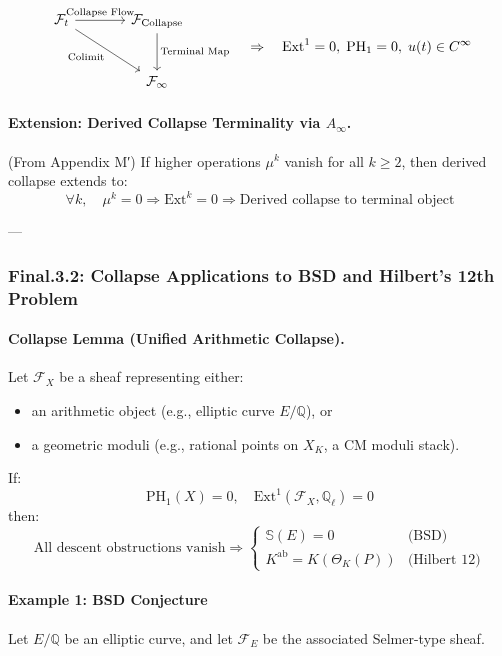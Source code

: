 \documentclass[11pt]{article}
\newcommand{\Sha}{\mathbb{S}}
\begin{document}
\begin{axiom}
\begin{axiom}
{{\[
\begin{tikzcd}[row sep=large, column sep=large]
\mathcal{F}_t \arrow[r, "\text{Collapse Flow}"] \arrow[dr, swap, "\text{Colimit}"] & 
\mathcal{F}_{\text{Collapse}} \arrow[d, "\text{Terminal Map}"] \\
& \mathcal{F}_\infty
\end{tikzcd}
\quad \Rightarrow \quad \mathrm{Ext}^1 = 0,\; \mathrm{PH}_1 = 0,\; u(t) \in C^\infty
\]

\paragraph{Extension: Derived Collapse Terminality via \(A_\infty\).}
(From Appendix M′) If higher operations \(\mu^k\) vanish for all \(k \geq 2\), then derived collapse extends to:
\[
\forall k, \quad \mu^k = 0 \Rightarrow \mathrm{Ext}^k = 0
\Rightarrow \text{Derived collapse to terminal object}
\]

---

\subsubsection*{Final.3.2: Collapse Applications to BSD and Hilbert’s 12th Problem}

\paragraph{Collapse Lemma (Unified Arithmetic Collapse).}
Let \( \mathcal{F}_X \) be a sheaf representing either:
\begin{itemize}
  \item an arithmetic object (e.g., elliptic curve \( E/\mathbb{Q} \)), or
  \item a geometric moduli (e.g., rational points on \( X_K \), a CM moduli stack).
\end{itemize}

If:
\[
\mathrm{PH}_1(X) = 0, \quad \mathrm{Ext}^1(\mathcal{F}_X, \mathbb{Q}_\ell) = 0
\]
then:
\[
\text{All descent obstructions vanish} \Rightarrow 
\begin{cases}
\Sha(E) = 0 & \text{(BSD)} \\
K^{\mathrm{ab}} = K(\Theta_K(P)) & \text{(Hilbert 12)}
\end{cases}
\]

\paragraph{Example 1: BSD Conjecture}
Let \( E/\mathbb{Q} \) be an elliptic curve, and let \( \mathcal{F}_E \) be the associated Selmer-type sheaf.

}}
\end{axiom}
\end{axiom}
\end{document}
